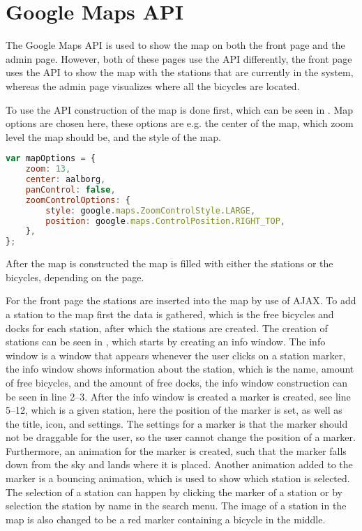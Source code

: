 \section{Google Maps API}\label{sec:googlemapsapi}
The Google Maps API \citep{misc:googlemapsapi} is used to show the map on both the front page and the admin page.
However, both of these pages use the API differently, the front page uses the API to show the map with the stations that are currently in the system, whereas the admin page visualizes where all the bicycles are located.

To use the API construction of the map is done first, which can be seen in .
Map options are chosen here, these options are e.g. the center of the map, which zoom level the map should be, and the style of the map.

\begin{minipage}{\textwidth}
\begin{lstlisting}[caption={Construction of the map}, label={lst:mapoptions}, language=Javascript]
var mapOptions = {
	zoom: 13,
	center: aalborg,
	panControl: false,
    zoomControlOptions: {
		style: google.maps.ZoomControlStyle.LARGE,
		position: google.maps.ControlPosition.RIGHT_TOP,
	},
};
\end{lstlisting}
\end{minipage}

After the map is constructed the map is filled with either the stations or the bicycles, depending on the page.

For the front page the stations are inserted into the map by use of AJAX.
To add a station to the map first the data is gathered, which is the free bicycles and docks for each station, after which the stations are created.
The creation of stations can be seen in , which starts by creating an info window.
The info window is a window that appears whenever the user clicks on a station marker, the info window shows information about the station, which is the name, amount of free bicycles, and the amount of free docks, the info window construction can be seen in line 2--3.
After the info window is created a marker is created, see line 5--12, which is a given station, here the position of the marker is set, as well as the title, icon, and settings.
The settings for a marker is that the marker should not be draggable for the user, so the user cannot change the position of a marker.
Furthermore, an animation for the marker is created, such that the marker falls down from the sky and lands where it is placed.
Another animation added to the marker is a bouncing animation, which is used to show which station is selected. The selection of a station can happen by clicking the marker of a station or by selection the station by name in the search menu.
The image of a station in the map is also changed to be a red marker containing a bicycle in the middle.

